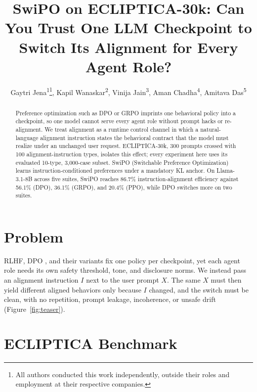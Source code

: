 \documentclass[letterpaper]{article} %
\title{SwiPO on ECLIPTICA-30k: Can You Trust One LLM Checkpoint to Switch Its Alignment for Every Agent Role?}
\author{
    Gaytri Jena\textsuperscript{\rm 1}\thanks{All authors conducted this work independently, outside their roles and employment at their respective companies.},
    Kapil Wanaskar\textsuperscript{\rm 2},
    Vini{}ja Jain\textsuperscript{\rm 3},  %
    Aman Chadha\textsuperscript{\rm 4},
    Amitava Das\textsuperscript{\rm 5}
}
\begin{document}
\maketitle

\begin{abstract}
Preference optimization such as DPO or GRPO imprints one behavioral policy into a checkpoint, so one model cannot serve every agent role without prompt hacks or re-alignment. We treat alignment as a runtime control channel in which a natural-language alignment instruction states the behavioral contract that the model must realize under an unchanged user request. ECLIPTICA-30k, 300 prompts crossed with 100 alignment-instruction types, isolates this effect; every experiment here uses its evaluated 10-type, 3,000-case subset. SwiPO (Switchable Preference Optimization) learns instruction-conditioned preferences under a mandatory KL anchor. On Llama-3.1-8B across five suites, SwiPO reaches 86.7\% instruction-alignment efficiency against 56.1\% (DPO), 36.1\% (GRPO), and 20.4\% (PPO), while DPO switches more on two suites.
\end{abstract}

\begin{links}
\end{links}

\section{Problem}

RLHF, DPO \cite{rafailov2023direct}, and their variants fix one policy per checkpoint, yet each agent role needs its own safety threshold, tone, and disclosure norms. We instead pass an alignment instruction $I$ next to the user prompt $X$. The same $X$ must then yield different aligned behaviors only because $I$ changed, and the switch must be clean, with no repetition, prompt leakage, incoherence, or unsafe drift (Figure~\ref{fig:teaser}).

\section{ECLIPTICA Benchmark}
\end{document}
